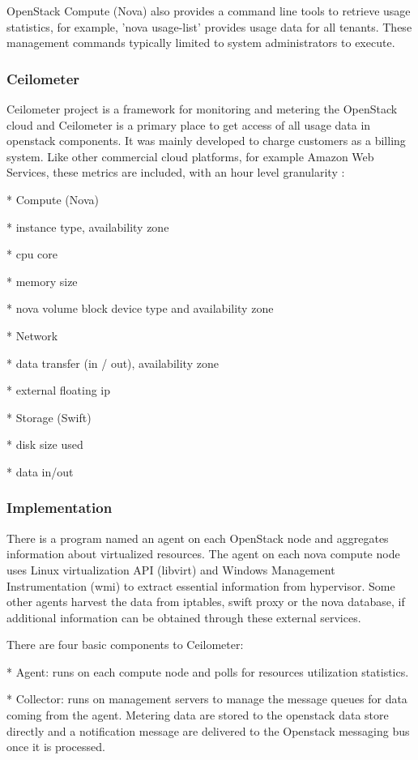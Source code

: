 \documentclass{sig-alternate}
\begin{document}
OpenStack Compute (Nova) also provides a command line tools to retrieve usage statistics, for example, 'nova usage-list' provides usage data for all tenants. These management commands typically limited to system administrators to execute.

\subsubsection{Ceilometer}

Ceilometer project is a framework for monitoring and metering the OpenStack cloud and Ceilometer is a primary place to get access of all usage data in openstack components. It was mainly developed to charge customers as a billing system. Like other commercial cloud platforms, for example Amazon Web Services, these metrics are included, with an hour level granularity :

* Compute (Nova)

* instance type, availability zone

* cpu core

* memory size

* nova volume block device type and availability zone

* Network

* data transfer (in / out), availability zone

* external floating ip

* Storage (Swift)

* disk size used

* data in/out

\subsubsection{Implementation}

There is a program named an agent on each OpenStack node and aggregates information about virtualized resources. The agent on each nova compute node uses Linux virtualization API (libvirt) and Windows Management Instrumentation (wmi) to extract essential information from hypervisor. Some other agents harvest the data from iptables, swift proxy or the nova database, if additional information can be obtained through these external services.

There are four basic components to Ceilometer:

* Agent: runs on each compute node and polls for resources utilization statistics.

* Collector: runs on management servers to manage the message queues for data coming from the agent. Metering data are stored to the openstack data store directly and a notification message are delivered to the Openstack messaging bus once it is processed.
\end{document}
